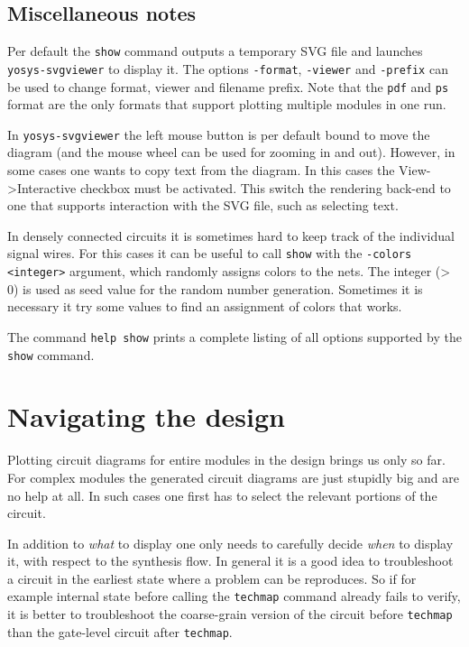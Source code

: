 \documentclass[9pt,technote,a4paper]{IEEEtran}
\begin{document}
\subsection{Miscellaneous notes}

Per default the {\tt show} command outputs a temporary SVG file and launches
{\tt yosys-svgviewer} to display it. The options {\tt -format}, {\tt -viewer}
and {\tt -prefix} can be used to change format, viewer and filename prefix.
Note that the {\tt pdf} and {\tt ps} format are the only formats that support
plotting multiple modules in one run.

In {\tt yosys-svgviewer} the left mouse button is per default bound to move the
diagram (and the mouse wheel can be used for zooming in and out). However, in
some cases one wants to copy text from the diagram. In this cases the
View->Interactive checkbox must be activated. This switch the rendering back-end
to one that supports interaction with the SVG file, such as selecting text.

In densely connected circuits it is sometimes hard to keep track of the
individual signal wires. For this cases it can be useful to call {\tt show}
with the {\tt -colors <integer>} argument, which randomly assigns colors to the
nets.  The integer (> 0) is used as seed value for the random number
generation. Sometimes it is necessary it try some values to find an assignment
of colors that works.

The command {\tt help show} prints a complete listing of all options supported
by the {\tt show} command.

\section{Navigating the design}
\label{navigate}

Plotting circuit diagrams for entire modules in the design brings us only so
far. For complex modules the generated circuit diagrams are just stupidly big
and are no help at all. In such cases one first has to select the relevant
portions of the circuit.

In addition to {\it what\/} to display one only needs to carefully decide
{\it when\/} to display it, with respect to the synthesis flow. In general
it is a good idea to troubleshoot a circuit in the earliest state where
a problem can be reproduces. So if for example internal state before calling
the {\tt techmap} command already fails to verify, it is better to troubleshoot 
the coarse-grain version of the circuit before {\tt techmap} than the gate-level
circuit after {\tt techmap}.
\end{document}
